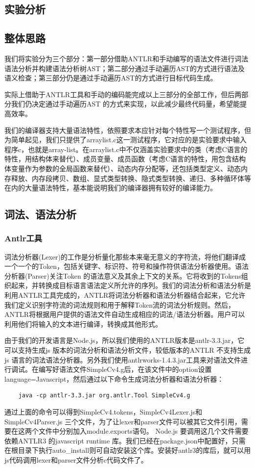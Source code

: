 \documentclass[a4paper]{article}
\begin{document}
\begin{CJK*}{UTF8}{gbsn}
    \section{实验分析}
    \subsection{整体思路}
    我们将实验分为三个部分：第一部分借助ANTLR和手动编写的语法文件进行词法语法分析并构建语法分析树AST；第二部分通过手动遍历AST的方式进行语法及语义检查；第三部分仍是通过手动遍历AST的方式进行目标代码生成。
    \par 实际上借助于ANTLR工具和手动的编码能完成以上三部分的全部工作，但后两部分我们仍决定通过手动遍历AST 的方式来实现，以此减少最终代码量，希望能提高效率。
    \par 我们的编译器支持大量语法特性，依照要求本应针对每个特性写一个测试程序，但为简单起见，我们只提供了arraylist.c这一测试程序，它对应的是实验要求中输入程序c，也就是array-list。在arraylist.c中不仅涵盖实验要求中的类（考虑C语言的特性，用结构体来替代）、成员变量、成员函数（考虑C语言的特性，用包含结构体变量作为参数的全局函数来替代）、动态内存分配等，还包括类型定义、动态内存释放、内存段拷贝、数组、显式类型转换、隐式类型转换、递归、多种循环体等在内的大量语法特性，基本能说明我们的编译器拥有较好的编译能力。

    \subsection{词法、语法分析}

    \subsubsection{Antlr工具}
    词法分析器(Lexer)的工作是分析量化那些本来毫无意义的字符流，将他们翻译成一个一个的Token，包括关键字、标识符、符号和操作符供语法分析器使用。语法分析器(Parser)关注Token 的语法意义及其余上下文的关系。它将收到的Tokens组织起来，并转换成目标语言语法定义所允许的序列。我们的词法分析和语法分析是利用ANTLR工具完成的，ANTLR将词法分析器和语法分析器结合起来，它允许我们定义识别字符流的词法规则和用于解释Token流的词法分析规则。然后，ANTLR将根据用户提供的语法文件自动生成相应的词法/语法分析器。用户可以利用他们将输入的文本进行编译，转换成其他形式。
    \par 由于我们的开发语言是Node.js，所以我们使用的ANTLR版本是antlr-3.3.jar，它可以支持生成js 版本的词法分析和语法分析文件，较低版本的ANTLR 不支持生成js 语言的词法语法分析器。另外我们使用antlrworks-1.4.3.jar工具来对语法文件进行调试。在编写好语法文件SimpleCv4.g后，在该文件中的option设置language=Javascript，然后通过以下命令生成词法分析器和语法分析器：
    \begin{verbatim}
    java -cp antlr-3.3.jar org.antlr.Tool SimpleCv4.g
    \end{verbatim}
    \par 通过上面的命令可以得到SimpleCv4.tokens，SimpleCv4Lexer.js和SimpleCv4Parser.js 三个文件，为了让lexer和parser文件可以被其它文件引用，需要在这两个文件中分别加入module.exports语句。 Node.js 要调用这几个文件需要依赖ANTLR3 的javascript runtime 库。我们已经在package.json中配置好，只需在根目录下执行auto\_install则可自动安装这个库。安装好antlr3的库后，就可以用js代码调用lexer和parser文件分析c代码文件了。

\end{CJK*}
\end{document}
